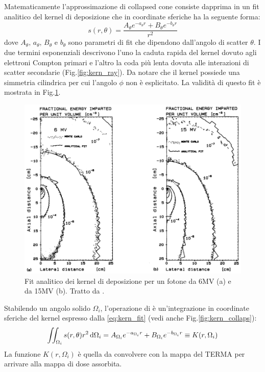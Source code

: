 {Matematicamente l'approssimazione di collapsed cone consiste dapprima in un fit analitico del kernel di deposizione che in coordinate sferiche ha la seguente forma:
\begin{equation}
\label{eq:kern_fit}
s(r,\theta) = \frac{A_\theta e^{-a_\theta r} + B_\theta e^{-b_\theta r}}{r^2}
\end{equation}
dove $A_\theta,\,a_\theta,\,B_\theta$ e $b_\theta$ sono parametri di fit che dipendono dall'angolo di scatter $\theta$. I due termini esponenziali descrivono l'uno la caduta rapida del kernel dovuto agli elettroni Compton primari e l'altro la coda più lenta dovuta alle interazioni di scatter secondarie (Fig.\ref{fig:kern_ray}). Da notare che il kernel possiede una simmetria cilindrica per cui l'angolo $\phi$ non è esplicitato. La validità di questo fit è mostrata in Fig.\ref{fig:kern_fit}.
\begin{figure}
\centering
\includegraphics[width=.8\textwidth]{./cap1/kern_fit.png}
\caption{Fit analitico dei kernel di deposizione per un fotone da 6MV (a) e da 15MV (b). Tratto da \cite{Ahnesjo1989}.}
\label{fig:kern_fit}
\end{figure}

Stabilendo un angolo solido $\Omega_i$, l'operazione di  è un'integrazione in coordinate sferiche del kernel espresso dalla \eqref{eq:kern_fit} (vedi anche Fig.\ref{fig:kern_collaps}):
\begin{equation}
\iint_{\Omega_i} s(r,\theta) r^2\,\text{d} \Omega_i = A_{\Omega_i} e^{-a_{\Omega_i} r} + B_{\Omega_i} e^{-b_{\Omega_i} r} \equiv K(r,\Omega_i)
\end{equation}
La funzione $K(r,\Omega_i)$ è quella da convolvere con la mappa del TERMA per arrivare alla mappa di dose assorbita.

}
